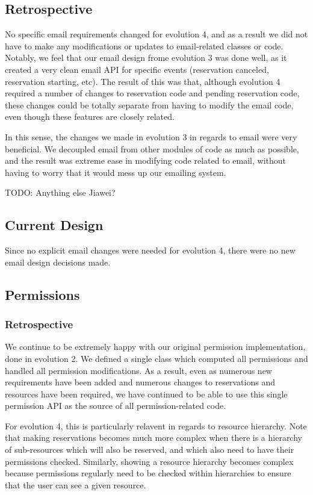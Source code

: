\documentclass[12pt]{article}
\begin{document}
\subsection{Retrospective}
No specific email requirements changed for evolution 4, and as a result we did not have to make any modifications or updates to email-related classes or code. Notably, we feel that our email design frome evolution 3 was done well, as it created a very clean email API for specific events (reservation canceled, reservation starting, etc). The result of this was that, although evolution 4 required a number of changes to reservation code and pending reservation code, these changes could be totally separate from having to modify the email code, even though these features are closely related. 

In this sense, the changes we made in evolution 3 in regards to email were very beneficial. We decoupled email from other modules of code as much as possible, and the result was extreme ease in modifying code related to email, without having to worry that it would mess up our emailing system. 

TODO: Anything else Jiawei?

\subsection{Current Design}
Since no explicit email changes were needed for evolution 4, there were no new email design decisions made. 


\subsection{Permissions}
\subsubsection{Retrospective}
We continue to be extremely happy with our original permission implementation, done in evolution 2. We defined a single class which computed all permissions and handled all permission modifications. As a result, even as numerous new requirements have been added and numerous changes to reservations and resources have been required, we have continued to be able to use this single permission API as the source of all permission-related code. 

For evolution 4, this is particularly relavent in regards to resource hierarchy. Note that making reservations becomes much more complex when there is a hierarchy of sub-resources which will also be reserved, and which also need to have their permissions checked. Similarly, showing a resource hierarchy becomes complex because permissions regularly need to be checked within hierarchies to ensure that the user can see a given resource. 
\end{document}
